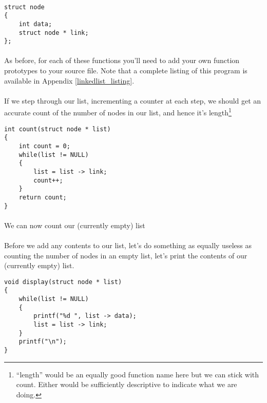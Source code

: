 \documentclass[10pt, a4paper, twosize]{article}
\begin{document}
\paragraph{} 
\begin{lstlisting}
struct node
{
    int data;
    struct node * link;
};
\end{lstlisting}
\paragraph{} 

\paragraph{} As before, for each of these functions you'll need to add your own function prototypes to your source file. Note that a complete listing of this program is available in Appendix \ref{linkedlist_listing}.

\paragraph{} If we step through our list, incrementing a counter at each step, we should get an accurate count of the number of nodes in our list, and hence it's length\footnote{``length'' would be an equally good function name here but we can stick with count. Either would be sufficiently descriptive to indicate what we are doing.}

\begin{lstlisting}
int count(struct node * list)
{
    int count = 0;
    while(list != NULL)
    {
        list = list -> link;
        count++;
    }
    return count;
}
\end{lstlisting}
\paragraph{} We can now count our (currently empty) list

\paragraph{} Before we add any contents to our list, let's do something as equally useless as counting the number of nodes in an empty list, let's print the contents of our (currently empty) list.
\begin{lstlisting}
void display(struct node * list)
{
    while(list != NULL)
    {
        printf("%d ", list -> data);
        list = list -> link;
    }
    printf("\n");
}
\end{lstlisting}
\end{document}
